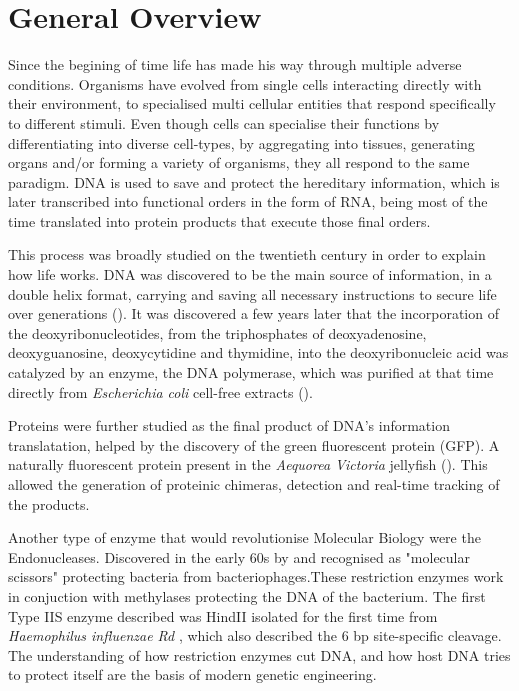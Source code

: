 \linespread{1.25}
\chapter{General Overview}


Since the begining of time life has made his way through multiple adverse
conditions. Organisms have evolved from single cells interacting directly with
their environment, to specialised multi cellular entities that respond
specifically to different stimuli. Even though cells can specialise their
functions by differentiating into diverse cell-types, by aggregating into tissues,
generating organs and/or forming a variety of organisms, they all respond to the
same paradigm. DNA is used to save and protect the hereditary information, which
is later transcribed into functional orders in the form of RNA, being most of
the time translated into protein products that execute those final orders.

This process was broadly studied on the twentieth century in order to explain
how life works. DNA was discovered to be the main source of information, in a
double helix format, carrying and saving all necessary instructions to secure
life over generations (\cite{watson1953molecular}). It was discovered a few
years later that the incorporation of the deoxyribonucleotides, from the
triphosphates of deoxyadenosine, deoxyguanosine, deoxycytidine and thymidine,
into the deoxyribonucleic acid was catalyzed by an enzyme, the DNA polymerase,
which was purified at that time directly from \textit{Escherichia coli}
cell-free extracts (\cite{lehman1958enzymatic}). 

Proteins were further studied as the final product of DNA's information
translatation, helped by the discovery of the green fluorescent protein (GFP). A
naturally fluorescent protein present in the \textit{Aequorea Victoria}
jellyfish (\cite{shimomura1962extraction}). This allowed the generation of
proteinic chimeras, detection and real-time tracking of the products. 

Another type of enzyme that would revolutionise Molecular Biology were the
Endonucleases. Discovered in the early 60s by \cite{arber1962host} and
recognised as "molecular scissors" protecting bacteria from bacteriophages.These
restriction enzymes work in conjuction with methylases protecting the DNA of the
bacterium. The first Type IIS enzyme described was HindII isolated for the first
time from \textit{Haemophilus influenzae Rd} \cite{smith1973suggested}, which
also described the 6 bp site-specific cleavage. The understanding of how
restriction enzymes cut DNA, and how host DNA tries to protect itself are the
basis of modern genetic engineering.

